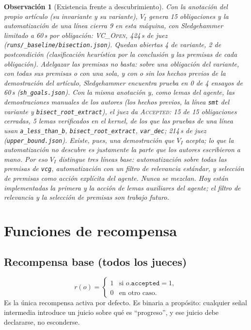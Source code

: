 \documentclass[11pt,a4paper]{article}
\newtheorem{remark}{Observación}
\begin{document}
\begin{remark}[Existencia frente a descubrimiento]
Con la anotación del propio artículo (su invariante y su variante), $V_I$ genera 15 obligaciones y la automatización de una línea cierra 9 en esta máquina, con Sledgehammer limitado a 60\,s por obligación: \textsc{VC\_Open}, 424\,s de juez (\texttt{runs/\_baseline/bisection.json}). Quedan abiertas 4 de variante, 2 de postcondición (clasificación heurística por la conclusión y las premisas de cada obligación). Adelgazar las premisas no basta: sobre una obligación del variante, con todas sus premisas o con una sola, y con o sin los hechos previos de la demostración del artículo, Sledgehammer encuentra prueba en 0 de 4 ensayos de 60\,s (\texttt{sh\_goals.json}). Con la misma anotación y, como lemas del agente, las demostraciones manuales de los autores (los hechos previos, la línea \texttt{smt} del variante y \texttt{bisect\_root\_extract}), el juez da \textsc{Accepted}: 15 de 15 obligaciones cerradas, 5 lemas verificados en el kernel, de los que las pruebas de una línea usan \texttt{a\_\allowbreak{}less\_\allowbreak{}than\_\allowbreak{}b}, \texttt{bisect\_\allowbreak{}root\_\allowbreak{}extract}, \texttt{var\_\allowbreak{}dec}; 214\,s de juez (\texttt{upper\_bound.json}). Existe, pues, una demostración que $V_I$ acepta; lo que la automatización no descubre es justamente la parte que los autores escribieron a mano. Por eso $V_I$ distingue tres líneas base: automatización sobre todas las premisas de \texttt{vcg}, automatización con un filtro de relevancia estándar, y selección de premisas como acción explícita del agente. Nunca se mezclan. Hoy están implementadas la primera y la acción de lemas auxiliares del agente; el filtro de relevancia y la selección de premisas son trabajo futuro.
\end{remark}

\section{Funciones de recompensa}

\subsection{Recompensa base (todos los jueces)}
\[
  r(o) = \begin{cases} 1 & \text{si } o.\texttt{accepted} = 1,\\ 0 & \text{en otro caso.}\end{cases}
\]
Es la única recompensa activa por defecto. Es binaria a propósito: cualquier señal intermedia introduce un juicio sobre qué es ``progreso'', y ese juicio debe declararse, no esconderse.
\end{document}
